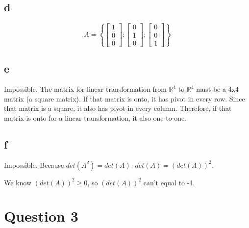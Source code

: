 \documentclass[10pt]{article}
\begin{document}
\subsection*{d}
\begin{equation*}
    A=
    \left\{
    \begin{bmatrix}
        1 \\
        0 \\
        0
    \end{bmatrix};
    \begin{bmatrix}
        0 \\
        1 \\
        0
    \end{bmatrix};
    \begin{bmatrix}
        0 \\
        0 \\
        1
    \end{bmatrix}
    \right\}
\end{equation*}


\subsection*{e}
\noindent Impossible. The matrix for linear transformation from $\mathbb{R}^4$ to $\mathbb{R}^4$ must be a 4x4 matrix (a square matrix). If that matrix is onto, it has pivot in every row. Since that matrix is a square, it also has pivot in every column. Therefore, if that matrix is onto for a linear transformation, it also one-to-one.



\subsection*{f}
\noindent Impossible. Because $det(A^2) = det(A)\cdot det(A) = \left(det(A) \right)^2$. \par
\noindent We know $\left(det(A) \right)^2 \geq 0$, so $\left(det(A) \right)^2$ can't equal to -1.


\section*{Question 3}
\end{document}
